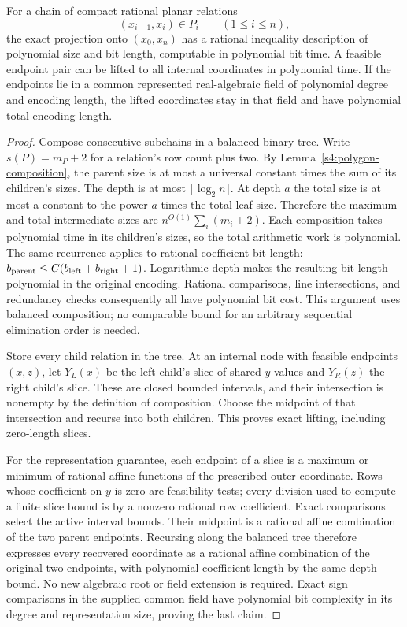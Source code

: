 \begin{theorem}
\label{s4:path-projection}
For a chain of compact rational planar relations
\begin{equation}
 (x_{i-1},x_i)\in P_i\qquad(1\le i\le n),
 \label{s4:path-chain}
\end{equation}
the exact projection onto $(x_0,x_n)$ has a rational inequality
description of polynomial size and bit length, computable in
polynomial bit time. A feasible endpoint pair can be lifted to all
internal coordinates in polynomial time. If the endpoints lie in a
common represented real-algebraic field of polynomial degree and
encoding length, the lifted coordinates stay in that field and have
polynomial total encoding length.
\end{theorem}
\begin{proof}
Compose consecutive subchains in a balanced binary tree. Write
$s(P)=m_P+2$ for a relation's row count plus two. By
Lemma~\ref{s4:polygon-composition}, the parent size is at most a
universal constant times the sum of its children's sizes. The depth
is at most $\lceil\log_2 n\rceil$. At depth $a$ the total size is
at most a constant to the power $a$ times the total leaf size.
Therefore the maximum and total intermediate sizes are
$n^{O(1)}\sum_i(m_i+2)$. Each composition takes polynomial time in
its children's sizes, so the total arithmetic work is polynomial.
The same recurrence applies to rational coefficient bit length:
$b_{\rm parent}\le C(b_{\rm left}+b_{\rm right}+1)$. Logarithmic
depth makes the resulting bit length polynomial in the original
encoding. Rational comparisons, line intersections, and redundancy
checks consequently all have polynomial bit cost. This argument
uses balanced composition; no comparable bound for an arbitrary
sequential elimination order is needed.

Store every child relation in the tree. At an internal node with
feasible endpoints $(x,z)$, let $Y_L(x)$ be the left child's slice
of shared $y$ values and $Y_R(z)$ the right child's slice. These
are closed bounded intervals, and their intersection is nonempty
by the definition of composition. Choose the midpoint of that
intersection and recurse into both children. This proves exact
lifting, including zero-length slices.

For the representation guarantee, each endpoint of a slice is a
maximum or minimum of rational affine functions of the prescribed
outer coordinate. Rows whose coefficient on $y$ is zero are
feasibility tests; every division used to compute a finite slice
bound is by a nonzero rational row coefficient. Exact comparisons
select the active interval bounds. Their midpoint is a rational
affine combination of the two parent endpoints. Recursing along
the balanced tree therefore expresses every recovered coordinate
as a rational affine combination of the original two endpoints,
with polynomial coefficient length by the same depth bound. No
new algebraic root or field extension is required. Exact sign
comparisons in the supplied common field have polynomial bit
complexity in its degree and representation size, proving the last
claim.
\end{proof}

